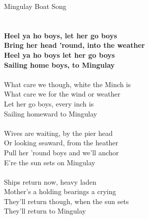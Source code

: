\documentclass[letterpaper,9pt]{article}
\begin{document}
\newpage
{}
\huge
Mingulay Boat Song\\
\\
\huge
\noindent
\\\textbf{Heel ya ho boys, let her go boys
\\Bring her head 'round, into the weather
\\Heel ya ho boys let her go boys
\\Sailing home boys, to Mingulay}
\\
\\What care we though, white the Minch is
\\What care we for the wind or weather
\\Let her go boys, every inch is
\\Sailing homeward to Mingulay
\\
\\Wives are waiting, by the pier head
\\Or looking seaward, from the heather
\\Pull her 'round boys and we'll anchor
\\E're the sun sets on Mingulay
\\
\\Ships return now, heavy laden
\\Mother's a holding bearings a crying
\\They'll return though, when the sun sets
\\They'll return to Mingulay
\end{document}
